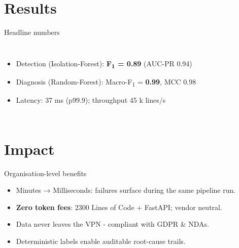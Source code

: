 \documentclass[14pt,aspectratio=169]{beamer}
\newcommand{\IForest}{Isolation-Forest\xspace}
\newcommand{\RForest}{Random-Forest\xspace}
\newcommand{\LOC}{Lines of Code\xspace}
\begin{document}
\section{Results}
\begin{frame}{Headline numbers}
\begin{columns}
\small
\begin{itemize}[<+->]
  \item Detection (\IForest): \textbf{F\textsubscript{1} = 0.89}  (AUC-PR 0.94)
  \item Diagnosis (\RForest): Macro-F\textsubscript{1} = \textbf{0.99}, MCC 0.98
  \item Latency: 37 ms (p99.9); throughput 45 k lines/s
\end{itemize}

\centering
\begin{adjustbox}{max width=\linewidth}
\end{adjustbox}
\end{columns}
\end{frame}

\section{Impact}
\begin{frame}{Organisation-level benefits}
\begin{itemize}[<+->]
  \item \alert{Minutes → Milliseconds}: failures surface during the same pipeline run.
  \item \textbf{Zero token fees}: 2300 \LOC{} + FastAPI; vendor neutral.
  \item Data never leaves the VPN - compliant with GDPR \& NDAs.
  \item Deterministic labels enable auditable root-cause trails.
\end{itemize}
\end{frame}
\end{document}
